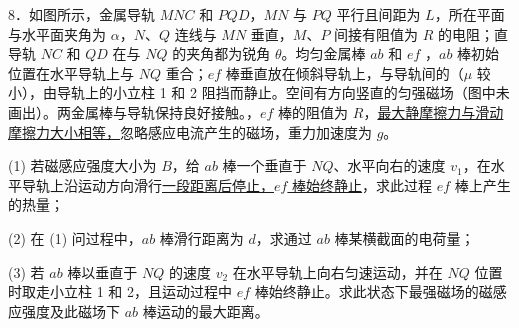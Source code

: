 \begin{problem}[剪贴题 8]
8．如图所示，金属导轨 $MNC$ 和 $PQD$，$MN$ 与 $PQ$ 平行且间距为 $L$，所在平面与水平面夹角为 $\alpha$，$N$、$Q$ 连线与 $MN$ 垂直，$M$、$P$ 间接有阻值为 $R$ 的电阻；直导轨 $NC$ 和 $QD$ 在与 $NQ$ 的夹角都为锐角 $\theta$。均匀金属棒 $ab$ 和 $ef$ ，$ab$ 棒初始位置在水平导轨上与 $NQ$ 重合；$ef$ 棒垂直放在倾斜导轨上，与导轨间的（$\mu$ 较小），由导轨上的小立柱 1 和 2 阻挡而静止。空间有方向竖直的匀强磁场（图中未画出）。两金属棒与导轨保持良好接触。，$ef$ 棒的阻值为 $R$，\underline{最大静摩擦力与滑动摩擦力大小相等，}忽略感应电流产生的磁场，重力加速度为 $g$。

(1) 若磁感应强度大小为 $B$，给 $ab$ 棒一个垂直于 $NQ$、水平向右的速度 $v_1$，在水平导轨上沿运动方向滑行\underline{一段距离后停止，}\underline{$ef$ 棒始终静止}，求此过程 $ef$ 棒上产生的热量；

(2) 在 (1) 问过程中，$ab$ 棒滑行距离为 $d$，求通过 $ab$ 棒某横截面的电荷量；

(3) 若 $ab$ 棒以垂直于 $NQ$ 的速度 $v_2$ 在水平导轨上向右匀速运动，并在 $NQ$ 位置时取走小立柱 1 和 2，且运动过程中 $ef$ 棒始终静止。求此状态下最强磁场的磁感应强度及此磁场下 $ab$ 棒运动的最大距离。

\end{problem}
